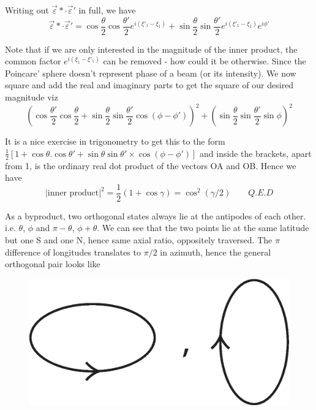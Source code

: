 Writing out $\overrightarrow{\varepsilon} \ast \cdot  \overrightarrow{\varepsilon}'$ in full, we have
$$
\overrightarrow{\varepsilon} \ast \cdot \overrightarrow{\varepsilon}' = \cos  \frac{\theta}{2} \cos \frac{\theta'}{2} e^{i (\xi'_1 - \xi_1)} + \sin \frac{\theta}{2} \sin \frac{\theta'}{2} e^{i (\xi'_1 - \xi_1)} e^{i \phi'}
$$

Note that if we are only interested in the magnitude of the inner product, the
common factor $e^{i(\xi_1 - \xi'_1)}$ can be removed - how could it be otherwise. Since the
Poincare' sphere doesn't represent phase of a beam (or its intensity). We now
square and add the real and imaginary parts to get the square of our desired
magnitude viz
$$
\left(\cos \frac{\theta'}{2} \cos \frac{\theta}{2} + \sin \frac{\theta}{2} \sin \frac{\theta'}{2} \cos (\phi - \phi') \right)^2 + \left(\sin \frac{\theta}{2} \sin \frac{\theta'}{2}
\sin \phi\right)^2
$$

It is a nice exercise in trigonometry to get this to the form $\frac{1}{2} [1 + \cos \theta . \cos \theta' +
\sin \theta \sin \theta'  \times \cos (\phi - \phi')]$ and inside the brackets, apart from 1, is the ordinary real dot product of the
vectors OA and OB. Hence we have
$$
|\text{inner product}|^2 = \frac{1}{2} (1 + \cos \gamma) = \cos^2 (\gamma/2) \qquad {Q.E.D}
$$


As a byproduct, two orthogonal states always lie at the antipodes of each
other. i.e. $\theta$, $\phi$ and $\pi - \theta$, $\phi + \theta$. We can see that the two points lie at the
same latitude but one S and one N, hence same axial ratio, oppositely traversed.
The $\pi$ difference of longitudes translates to $\pi/2$ in azimuth, hence the general
orthogonal pair looks like
\begin{figure}[H]
\centering
\includegraphics[scale=0.2]{src/images/chap26/8.jpg}
\end{figure}

